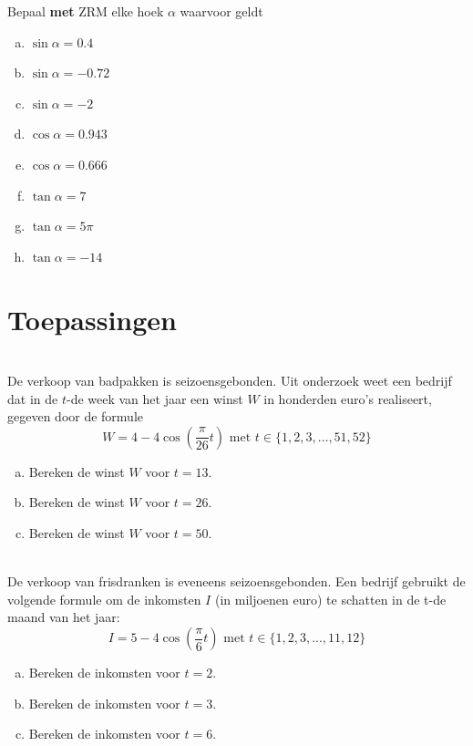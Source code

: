 \documentclass[a4paper,12pt]{article}
\begin{document}
\begin{oefening}
Bepaal \textbf{met} ZRM elke hoek $\alpha$ waarvoor geldt
\begin{enumerate}[(a)]
  \item $\sin\alpha=0.4$
  \item $\sin\alpha=-0.72$
  \item $\sin\alpha=-2$
  \item $\cos\alpha=0.943$
  \item $\cos\alpha=0.666$
  \item $\tan\alpha=7$
  \item $\tan\alpha=5\pi$
  \item $\tan\alpha=-14$
\end{enumerate}
\end{oefening}

\pagebreak
\section{Toepassingen}

\begin{oefening}\\
De verkoop van badpakken is seizoensgebonden. Uit onderzoek weet een bedrijf dat in de $t$-de week van het jaar een winst $W$ in honderden euro's realiseert, gegeven door de formule
$$W=4-4\cos\left(\dfrac{\pi}{26}t\right) \mbox{ met } t\in \{1,2,3,\ldots,51,52\}$$
\begin{enumerate}[(a)]
  \item Bereken de winst $W$ voor $t=13$.
  \item Bereken de winst $W$ voor $t=26$.
  \item Bereken de winst $W$ voor $t=50$.
\end{enumerate}
\end{oefening}

\begin{oefening}\\
De verkoop van frisdranken is eveneens seizoensgebonden. Een bedrijf gebruikt de volgende formule om de inkomsten $I$ (in miljoenen euro) te schatten in de t-de maand van het jaar:
$$I=5-4\cos\left(\dfrac{\pi}{6}t\right) \mbox{ met } t\in \{1,2,3,...,11,12\}$$
\begin{enumerate}[(a)]
  \item Bereken de inkomsten voor $t=2$.
  \item Bereken de inkomsten voor $t=3$.
  \item Bereken de inkomsten voor $t=6$.
\end{enumerate}
\end{oefening}
\end{document}
